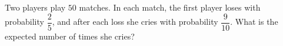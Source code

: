 Two players play $50$ matches. In each match, the first player loses with probability $\dfrac25$, and after each loss she cries with probability $\dfrac9{10}$. What is the expected number of times she cries?
